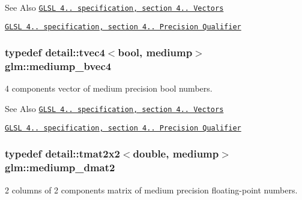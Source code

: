 \begin{DoxySeeAlso}{See Also}
\href{http://www.opengl.org/registry/doc/GLSLangSpec.4.20.8.pdf}{\tt G\-L\-S\-L 4.. specification, section 4.. Vectors} 

\href{http://www.opengl.org/registry/doc/GLSLangSpec.4.20.8.pdf}{\tt G\-L\-S\-L 4.. specification, section 4.. Precision Qualifier} 
\end{DoxySeeAlso}
\hypertarget{group__core__precision_ga8bb7cfe902e2cb356450d211ca4d58e2}{
\subsubsection[{mediump\-\_\-bvec4}]{\setlength{\rightskip}{0pt plus 5cm}typedef detail\-::tvec4$<$bool, mediump$>$ {\bf glm\-::mediump\-\_\-bvec4}}}\label{group__core__precision_ga8bb7cfe902e2cb356450d211ca4d58e2}
4 components vector of medium precision bool numbers.

\begin{DoxySeeAlso}{See Also}
\href{http://www.opengl.org/registry/doc/GLSLangSpec.4.20.8.pdf}{\tt G\-L\-S\-L 4.. specification, section 4.. Vectors} 

\href{http://www.opengl.org/registry/doc/GLSLangSpec.4.20.8.pdf}{\tt G\-L\-S\-L 4.. specification, section 4.. Precision Qualifier} 
\end{DoxySeeAlso}
\hypertarget{group__core__precision_gac056ec9d1c37e591172544088163b7e4}{
\subsubsection[{mediump\-\_\-dmat2}]{\setlength{\rightskip}{0pt plus 5cm}typedef detail\-::tmat2x2$<$double, mediump$>$ {\bf glm\-::mediump\-\_\-dmat2}}}\label{group__core__precision_gac056ec9d1c37e591172544088163b7e4}
2 columns of 2 components matrix of medium precision floating-\/point numbers.


